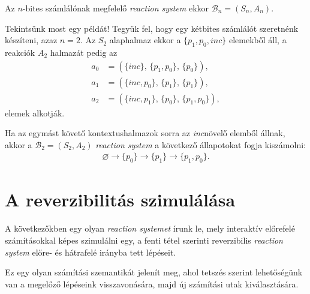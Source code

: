 \documentclass[12pt]{article}
\theoremstyle{definition}
\theoremstyle{remark}
\theoremstyle{plain}
\let\emptyset\varnothing
\newcommand{\inc}{\textit{inc}}
\newcommand{\reaction}[3]{
    (#1, \, #2, \, #3)
}
\begin{document}
    Az $n$-bites számlálónak megfelelő \textit{reaction system} ekkor $\mathcal{B}_{n}=(S_{n}, A_{n})$.

    Tekintsünk most egy példát! Tegyük fel, hogy egy kétbites számlálót szeretnénk készíteni, azaz $n = 2$. Az $S_{2}$ alaphalmaz ekkor a $\{p_{1}, p_{0}, \inc\}$ elemekből áll, a reakciók $A_{2}$ halmazát pedig az
    \begin{align*}
        a_{0} &= \reaction{\{ \inc \}}{\{ p_{1}, p_{0} \}}{\{ p_{0} \}}, \\
        a_{1} &= \reaction{\{ \inc, p_{0} \}}{\{ p_{1} \}}{\{ p_{1} \}}, \\
        a_{2} &= \reaction{\{ \inc, p_{1} \}}{\{ p_{0} \}}{\{ p_{1}, p_{0} \}},
    \end{align*}
    elemek alkotják.

    Ha az egymást követő kontextushalmazok sorra az \inc növelő elemből állnak, akkor a $\mathcal{B}_{2} = (S_{2}, A_{2})$ \textit{reaction system} a következő állapotokat fogja kiszámolni:
    \begin{align*}
        \emptyset \rightarrow \{p_{0}\} \rightarrow \{p_{1}\} \rightarrow \{p_{1}, p_{0}\}.
    \end{align*}

    \section*{A reverzibilitás szimulálása}

    A következőkben egy olyan \textit{reaction systemet} írunk le, mely interaktív előrefelé számításokkal képes szimulálni egy, a fenti tétel szerinti reverzibilis \textit{reaction system} előre- és hátrafelé irányba tett lépéseit.

    Ez egy olyan számítási szemantikát jelenít meg, ahol tetszés szerint lehetőségünk van a megelőző lépéseink visszavonására, majd új számítási utak kiválasztására.
\end{document}
